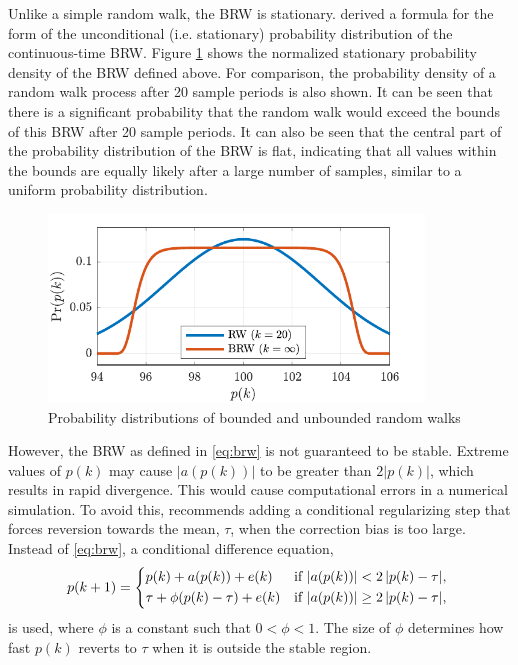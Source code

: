 Unlike a simple random walk, the \gls{BRW} is stationary. \cite{nicolau_stationary_2002} derived a formula for the form of the unconditional (i.e. stationary) probability distribution of the continuous-time \gls{BRW}. Figure \ref{fig:brw-pdf} shows the normalized stationary probability density of the \gls{BRW} defined above. For comparison, the probability density of a random walk process after 20 sample periods is also shown. It can be seen that there is a significant probability that the random walk would exceed the bounds of this \gls{BRW} after 20 sample periods. It can also be seen that the central part of the probability distribution of the \gls{BRW} is flat, indicating that all values within the bounds are equally likely after a large number of samples, similar to a uniform probability distribution.


\begin{figure}[ht]
	\centering
	\includegraphics[height=5cm]{images/brw_pdf.pdf}
	\caption{Probability distributions of bounded and unbounded random walks}
	\label{fig:brw-pdf}
\end{figure}

However, the \gls{BRW} as defined in \eqref{eq:brw} is not guaranteed to be stable. Extreme values of $p(k)$ may cause $|a(p(k))|$ to be greater than $2|p(k)|$, which results in rapid divergence. This would cause computational errors in a numerical simulation. To avoid this, \cite{nicolau_stationary_2002} recommends adding a conditional regularizing step that forces reversion towards the mean, $\tau$, when the correction bias is too large. Instead of \eqref{eq:brw}, a conditional difference equation,
\begin{equation} \label{eq:brw-reg}
	p(k+1) = \begin{cases*}
		p(k) + a(p(k)) + e(k) & if $\left|a(p(k)) \right| < 2\left| p(k) - \tau \right|$, \\
		\tau + \phi(p(k) - \tau) + e(k) & if $\left|a(p(k)) \right| \geq 2\left| p(k) - \tau \right|$,
	\end{cases*}
\end{equation}
is used, where $\phi$ is a constant such that $0<\phi<1$. The size of $\phi$ determines how fast $p(k)$ reverts to $\tau$ when it is outside the stable region.

